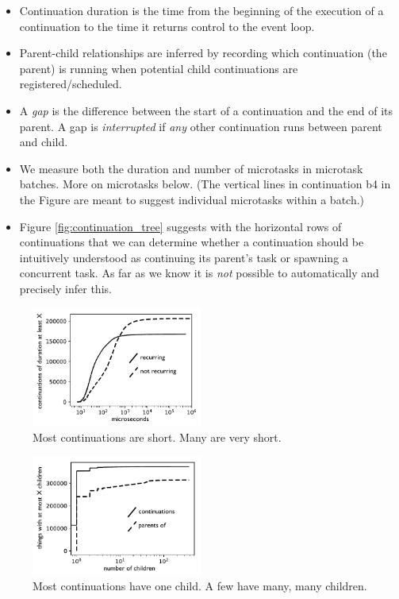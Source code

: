 \documentclass[sigplan,10pt,review,anonymous]{acmart}\settopmatter{printfolios=true,printccs=false,printacmref=false}
\begin{document}
\begin{itemize}
\item Continuation duration is the time from the beginning of the execution of a continuation to the time it returns control to the event loop.
\item Parent-child relationships are inferred by recording which continuation (the parent) is running when potential child continuations are registered/scheduled.
\item A \emph{gap} is the difference between the start of a continuation and the end of its parent.
  A gap is \emph{interrupted} if \emph{any} other continuation runs between parent and child.
\item We measure both the duration and number of microtasks in microtask batches.
  More on microtasks below.
  (The vertical lines in continuation b4 in the Figure are meant to suggest individual microtasks within a batch.)
\item Figure \ref{fig:continuation_tree} suggests with the horizontal rows of continuations that we can determine whether a continuation should be intuitively understood as continuing its parent's task or spawning a concurrent task.
  As far as we know it is \emph{not} possible to automatically and precisely infer this.
\end{itemize}

\begin{figure}
\hspace*{-0.2cm}\includegraphics[width=0.5\textwidth]{duration_graph_bw}
\caption{Most continuations are short.
  Many are very short.}
\label{fig:graph_duration}
\end{figure}

\begin{figure}
\hspace*{-0.2cm}\includegraphics[width=0.5\textwidth]{children_graph_bw}
\caption{Most continuations have one child.
A few have many, many children.}
\label{fig:graph_branching}
\end{figure}
\end{document}
